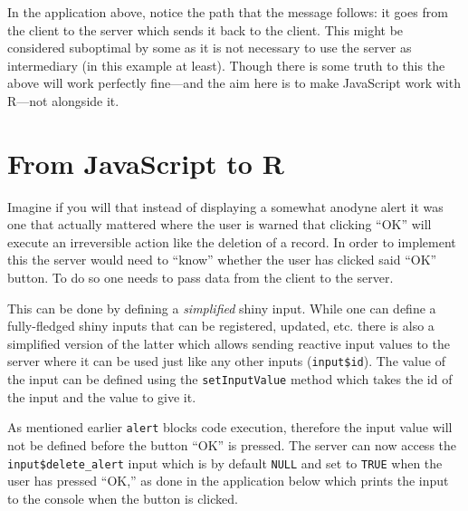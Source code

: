 \documentclass[
]{krantz}
\makeatletter
\newenvironment{Shaded}{\begin{snugshade}}{\end{snugshade}}
\newcommand{\KeywordTok}[1]{\textcolor[rgb]{0.27,0.27,0.27}{\textbf{#1}}}
\newcommand{\NormalTok}[1]{#1}
\newcommand{\OperatorTok}[1]{\textcolor[rgb]{0.43,0.43,0.43}{\textbf{#1}}}
\newcommand{\StringTok}[1]{\textcolor[rgb]{0.5,0.5,0.5}{#1}}
\newenvironment{kframe}{%
\medskip{}
\setlength{\fboxsep}{.8em}
 \def\at@end@of@kframe{}%
 \ifinner\ifhmode%
  \def\at@end@of@kframe{\end{minipage}}%
  \begin{minipage}{\columnwidth}%
 \fi\fi%
 \def\FrameCommand##1{\hskip\@totalleftmargin \hskip-\fboxsep
 \colorbox{shadecolor}{##1}\hskip-\fboxsep
     \hskip-\linewidth \hskip-\@totalleftmargin \hskip\columnwidth}%
 \MakeFramed {\advance\hsize-\width
   \@totalleftmargin\z@ \linewidth\hsize
   \@setminipage}}%
 {\par\unskip\endMakeFramed%
 \at@end@of@kframe}
\renewenvironment{Shaded}{\begin{kframe}}{\end{kframe}}
\makeatother
\begin{document}
In the application above, notice the path that the message follows: it goes from the client to the server which sends it back to the client. This might be considered suboptimal by some as it is not necessary to use the server as intermediary (in this example at least). Though there is some truth to this the above will work perfectly fine---and the aim here is to make JavaScript work with R---not alongside it.

\hypertarget{from-javascript-to-r}{%
\section*{From JavaScript to R}\label{from-javascript-to-r}}


Imagine if you will that instead of displaying a somewhat anodyne alert it was one that actually mattered where the user is warned that clicking ``OK'' will execute an irreversible action like the deletion of a record. In order to implement this the server would need to ``know'' whether the user has clicked said ``OK'' button. To do so one needs to pass data from the client to the server.

This can be done by defining a \emph{simplified} shiny input. While one can define a fully-fledged shiny inputs that can be registered, updated, etc. there is also a simplified version of the latter which allows sending reactive input values to the server where it can be used just like any other inputs (\texttt{input\$id}). The value of the input can be defined using the \texttt{setInputValue} method which takes the id of the input and the value to give it.

\begin{Shaded}
\end{Shaded}

As mentioned earlier \texttt{alert} blocks code execution, therefore the input value will not be defined before the button ``OK'' is pressed. The server can now access the \texttt{input\$delete\_alert} input which is by default \texttt{NULL} and set to \texttt{TRUE} when the user has pressed ``OK,'' as done in the application below which prints the input to the console when the button is clicked.
\end{document}
